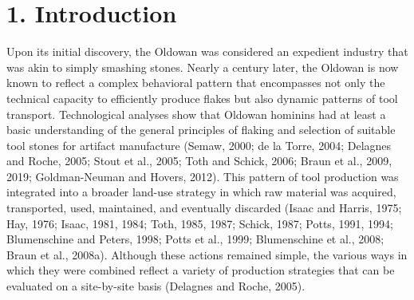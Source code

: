 \documentclass[]{elsarticle} %
\begin{document}
\hypertarget{introduction}{%
\section{1. Introduction}\label{introduction}}

Upon its initial discovery, the Oldowan was considered an expedient
industry that was akin to simply smashing stones. Nearly a century
later, the Oldowan is now known to reflect a complex behavioral pattern
that encompasses not only the technical capacity to efficiently produce
flakes but also dynamic patterns of tool transport. Technological
analyses show that Oldowan hominins had at least a basic understanding
of the general principles of flaking and selection of suitable tool
stones for artifact manufacture (Semaw, 2000; de la Torre, 2004;
Delagnes and Roche, 2005; Stout et al., 2005; Toth and Schick, 2006;
Braun et al., 2009, 2019; Goldman-Neuman and Hovers, 2012). This pattern
of tool production was integrated into a broader land-use strategy in
which raw material was acquired, transported, used, maintained, and
eventually discarded (\hspace{0pt}Isaac and Harris, 1975\hspace{0pt};
\hspace{0pt}Hay, 1976\hspace{0pt}; \hspace{0pt}Isaac, 1981\hspace{0pt},
\hspace{0pt}1984\hspace{0pt}; \hspace{0pt}Toth, 1985\hspace{0pt},
\hspace{0pt}1987\hspace{0pt}; \hspace{0pt}Schick, 1987\hspace{0pt};
\hspace{0pt}Potts, 1991\hspace{0pt}, \hspace{0pt}1994\hspace{0pt};
\hspace{0pt}Blumenschine and Peters, 1998\hspace{0pt}; \hspace{0pt}Potts
et al., 1999\hspace{0pt}; \hspace{0pt}Blumenschine et al.,
2008\hspace{0pt}; \hspace{0pt}Braun et al., 2008a\hspace{0pt}). Although
these actions remained simple, the various ways in which they were
combined reflect a variety of production strategies that can be
evaluated on a site-by-site basis (\hspace{0pt}Delagnes and Roche,
2005\hspace{0pt}).
\end{document}
